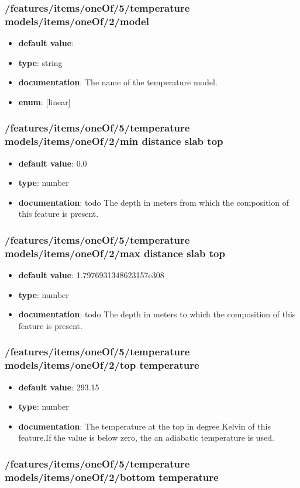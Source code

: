 \subsubsection{/features/items/oneOf/5/temperature models/items/oneOf/2/model}
\begin{itemize}\item {\bf default value}: 
\item {\bf type}: string
\item {\bf documentation}: The name of the temperature model.
\item {\bf enum}: [linear]\end{itemize}\subsubsection{/features/items/oneOf/5/temperature models/items/oneOf/2/min distance slab top}
\begin{itemize}\item {\bf default value}: 0.0
\item {\bf type}: number
\item {\bf documentation}: todo The depth in meters from which the composition of this feature is present.
\end{itemize}\subsubsection{/features/items/oneOf/5/temperature models/items/oneOf/2/max distance slab top}
\begin{itemize}\item {\bf default value}: 1.7976931348623157e308
\item {\bf type}: number
\item {\bf documentation}: todo The depth in meters to which the composition of this feature is present.
\end{itemize}\subsubsection{/features/items/oneOf/5/temperature models/items/oneOf/2/top temperature}
\begin{itemize}\item {\bf default value}: 293.15
\item {\bf type}: number
\item {\bf documentation}: The temperature at the top in degree Kelvin of this feature.If the value is below zero, the an adiabatic temperature is used.
\end{itemize}\subsubsection{/features/items/oneOf/5/temperature models/items/oneOf/2/bottom temperature}

